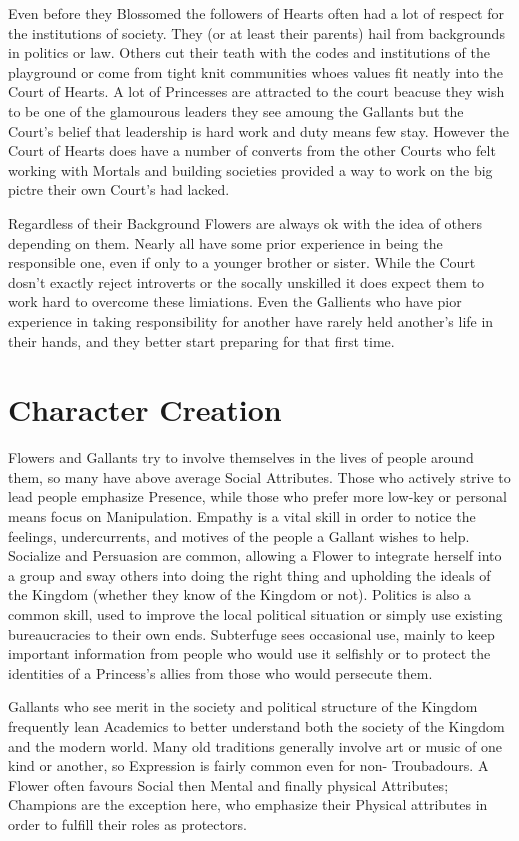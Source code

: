 Even before they Blossomed the followers of Hearts often had a lot of respect for the institutions of society. They (or at least their parents) hail from backgrounds in politics or law. Others cut their teath with the codes and institutions of the playground or come from tight knit communities whoes values fit neatly into the Court of Hearts. A lot of Princesses are attracted to the court beacuse they wish to be one of the glamourous leaders they see amoung the Gallants but the Court's belief that leadership is hard work and duty means few stay. However the Court of Hearts does have a number of converts from the other Courts who felt working with Mortals and building societies provided a way to work on the big pictre their own Court's had lacked. 

Regardless of their Background Flowers are always ok with the idea of others depending on them. Nearly all have some prior experience in being the responsible one, even if only to a younger brother or sister. While the Court dosn't exactly reject introverts or the socally unskilled it does expect them to work hard to overcome these limiations. Even the Gallients who have pior experience in taking responsibility for another have rarely held another's life in their hands, and they better start preparing for that first time. 

\section*{Character Creation}
Flowers and Gallants try to involve themselves in the lives of people around them, so many have above average Social Attributes. Those who actively strive to lead people emphasize Presence, while those who prefer more low-key or personal means focus on Manipulation. Empathy is a vital skill in order to notice the feelings, undercurrents, and motives of the people a Gallant wishes to help. Socialize and Persuasion are common, allowing a Flower to integrate herself into a group and sway others into doing the right thing and upholding the ideals of the Kingdom (whether they know of the Kingdom or not). Politics is also a common skill, used to improve the local political situation or simply use existing bureaucracies to their own ends. Subterfuge sees occasional use, mainly to keep important information from people who would use it selfishly or to protect the identities of a Princess's allies from those who would persecute them. 

Gallants who see merit in the society and political structure of the Kingdom frequently lean Academics to better understand both the society of the Kingdom and the modern world. Many old traditions generally involve art or music of one kind or another, so Expression is fairly common even for non- Troubadours. A Flower often favours Social then Mental and finally physical Attributes; Champions are the exception here, who emphasize their Physical attributes in order to fulfill their roles as protectors.

